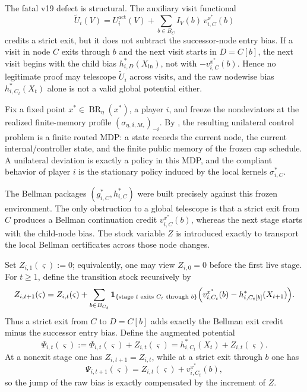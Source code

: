 \documentclass[12pt]{article}
\theoremstyle{definition}
\newcommand{\1}{\mathbf{1}}
\DeclareMathOperator{\BR}{BR}
\begin{document}
The fatal v19 defect is structural. The auxiliary visit functional
\[
\widetilde U_i(V)
=
U_i^{\mathrm{act}}(V)
+
\sum_{b\in B_C}I_V(b)\,v_{i,C}^{x^*}(b)
\]
credits a strict exit, but it does not subtract the successor-node entry bias. If
a visit in node $C$ exits through $b$ and the next visit starts in $D=C[b]$, the
next visit begins with the child bias $h_{i,D}^*(X_{\mathrm{in}})$, not with
$-v_{i,C}^{x^*}(b)$. Hence no legitimate proof may telescope
$\widetilde U_i$ across visits, and the raw nodewise bias
$h_{i,C_t}^*(X_t)$ alone is not a valid global potential either.

Fix a fixed point $x^*\in\BR_\eta(x^*)$, a player $i$, and freeze the
nondeviators at the realized finite-memory profile
$(\sigma_{\eta,\delta,M_*})_{-i}$. By , the resulting
unilateral control problem is a finite routed MDP: a state records the current
node, the current internal/controller state, and the finite public memory of the
frozen cap schedule. A unilateral deviation is exactly a policy in this MDP, and
the compliant behavior of player $i$ is the stationary policy induced by the
local kernels $\sigma_{i,C}^*$.

The Bellman packages $(g_{i,C}^*,h_{i,C}^*)$ were built precisely against this
frozen environment. The only obstruction to a global telescope is that a strict
exit from $C$ produces a Bellman continuation credit $v_{i,C}^{x^*}(b)$,
whereas the next stage starts with the child-node bias. The stock variable $Z$
is introduced exactly to transport the local Bellman certificates across those
node changes.

Set $Z_{i,1}(\varsigma):=0$; equivalently, one may view $Z_{i,0}=0$ before the
first live stage. For $t\ge 1$, define the transition stock recursively by
\begin{equation}
\label{eq:psi-stock-update}
Z_{i,t+1}(\varsigma)
=
Z_{i,t}(\varsigma)
+
\sum_{b\in B_{C_t}}
\1_{\{\textnormal{stage }t\textnormal{ exits }C_t\textnormal{ through }b\}}
\Bigl(
v_{i,C_t}^{x^*}(b)-h_{i,C_t[b]}^*(X_{t+1})
\Bigr).
\end{equation}
Thus a strict exit from $C$ to $D=C[b]$ adds exactly the Bellman exit credit
minus the successor entry bias. Define the augmented potential
\begin{equation}
\label{eq:psi-def}
\Psi_{i,t}(\varsigma)
:=
\Phi_{i,t}(\varsigma)+Z_{i,t}(\varsigma)
=
h_{i,C_t}^*(X_t)+Z_{i,t}(\varsigma).
\end{equation}
At a nonexit stage one has $Z_{i,t+1}=Z_{i,t}$, while at a strict exit through
$b$ one has
\[
\Psi_{i,t+1}(\varsigma)=Z_{i,t}(\varsigma)+v_{i,C_t}^{x^*}(b),
\]
so the jump of the raw bias is exactly compensated by the increment of $Z$.
\end{document}
